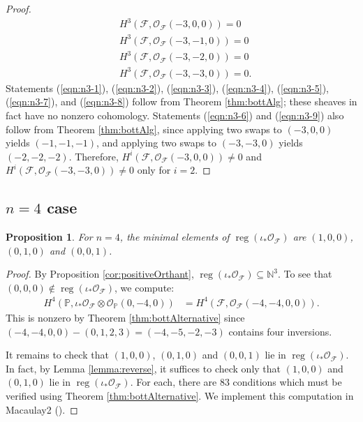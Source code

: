 \documentclass[12pt,reqno]{amsart}
\newtheorem{proposition}[theorem]{Proposition}
\theoremstyle{definition}
\theoremstyle{remark}
\newcommand{\reg}{\operatorname{reg}}
\newcommand{\calF}{{\mathcal{F}}}
\newcommand{\calO}{{\mathcal{O}}}
\begin{document}
\begin{proof}
\begin{align}
        &H^3(\calF,\calO_{\calF}(-3,0,0)) = 0 \label{eqn:n3-6}\\
        &H^3(\calF,\calO_{\calF}(-3,-1,0)) = 0 \label{eqn:n3-7}\\
        &H^3(\calF,\calO_{\calF}(-3,-2,0)) = 0 \label{eqn:n3-8}\\
        &H^3(\calF,\calO_{\calF}(-3,-3,0)) = 0. \label{eqn:n3-9}
    \end{align}
    Statements (\ref{eqn:n3-1}), (\ref{eqn:n3-2}), (\ref{eqn:n3-3}), (\ref{eqn:n3-4}), (\ref{eqn:n3-5}), (\ref{eqn:n3-7}), and (\ref{eqn:n3-8}) follow from  Theorem \ref{thm:bottAlg}; these sheaves in fact have no nonzero cohomology. Statements (\ref{eqn:n3-6}) and (\ref{eqn:n3-9}) also follow from Theorem \ref{thm:bottAlg}, since applying two swaps to $(-3,0,0)$ yields $(-1,-1,-1)$, and applying two swaps to $(-3,-3,0)$ yields $(-2,-2,-2)$.  Therefore, $H^i(\calF,\calO_{\calF}(-3,0,0)) \neq 0$ and $H^i(\calF,\calO_{\calF}(-3,-3,0)) \neq 0$ only for $i=2$.
\end{proof}


\subsection{$n=4$ case}

\begin{proposition}
\label{prop:n4}
    For $n=4$, the minimal elements of $\reg(\iota_*\calO_{\calF})$ are $(1,0,0)$, $(0,1,0)$ and $(0,0,1)$.
\end{proposition}

\begin{proof}
By Proposition \ref{cor:positiveOrthant}, $\reg(\iota_*\calO_{\calF}) \subseteq \mathbb N^3$.  To see that $(0,0,0) \notin \reg(\iota_*\calO_{\calF})$, we compute:
\begin{align*}
    H^4(\mathbb P,\iota_*\calO_{\calF}\otimes\calO_{\mathbb P}(0,-4,0)) &= H^4(\calF, \calO_{\calF}(-4,-4,0,0)).
\end{align*}
This is nonzero by Theorem \ref{thm:bottAlternative} since $(-4,-4,0,0)-(0,1,2,3) = (-4,-5,-2,-3)$ contains four inversions.

It remains to check that $(1,0,0)$, $(0,1,0)$ and $(0,0,1)$ lie in $\reg(\iota_*\calO_{\calF})$.  In fact, by Lemma \ref{lemma:reverse}, it suffices to check only that $(1,0,0)$ and $(0,1,0)$ lie in $\reg(\iota_*\calO_{\calF})$.  For each, there are 83 conditions which must be verified using Theorem \ref{thm:bottAlternative}.  We implement this computation in Macaulay2 (\cite{githubRepo}).
\end{proof}
\end{document}

